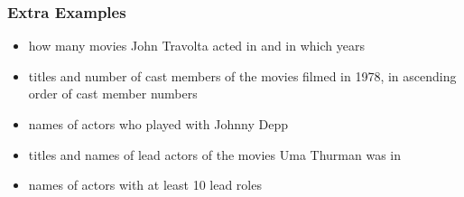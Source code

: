 \documentclass[dvipsnames]{beamer}
\theoremstyle{plain}
\begin{document}
\begin{frame}
  \frametitle{Extra Examples}

  \begin{itemize}
    \item how many movies John Travolta acted in and in which years
    \item titles and number of cast members of the movies filmed in 1978,
      in ascending order of cast member numbers
    \item names of actors who played with Johnny Depp
    \item titles and names of lead actors of the movies Uma Thurman was in
    \item names of actors with at least 10 lead roles
  \end{itemize}
\end{frame}
%
%
%
%
\end{document}
